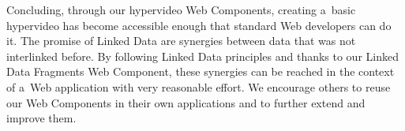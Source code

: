 \documentclass[runningheads,a4paper]{llncs}
\begin{document}
Concluding, through our hypervideo Web Components, creating a~basic hypervideo
has become accessible enough that standard Web developers can do it.
The promise of Linked Data are synergies between data that was not interlinked before.
By following Linked Data principles and thanks to our Linked Data Fragments Web Component,
these synergies can be reached in the context of a~Web application with very reasonable effort.
We encourage others to reuse our Web Components in their own applications
and to further extend and improve them.



\end{document}
